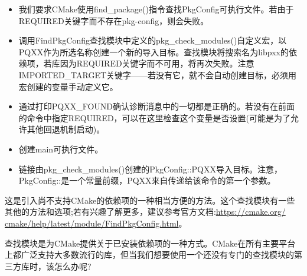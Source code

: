 \begin{itemize}
\item 
我们要求CMake使用find\_package()指令查找PkgConfig可执行文件。若由于REQUIRED关键字而不存在pkg-config，则会失败。

\item 
调用FindPkgConfig查找模块中定义的pkg\_check\_modules()自定义宏，以PQXX作为所选名称创建一个新的导入目标。查找模块将搜索名为libpxx的依赖项，若库因为REQUIRED关键字而不可用，将再次失败。注意IMPORTED\_TARGET关键字——若没有它，就不会自动创建目标，必须用宏创建的变量手动定义它。


\item 
通过打印PQXX\_FOUND确认诊断消息中的一切都是正确的。若没有在前面的命令中指定REQUIRED，可以在这里检查这个变量是否设置(可能是为了允许其他回退机制启动)。

\item 
创建main可执行文件。

\item 
链接由pkg\_check\_modules()创建的PkgConfig::PQXX导入目标。注意，PkgConfig::是一个常量前缀，PQXX来自传递给该命令的第一个参数。
\end{itemize}

这是引入尚不支持CMake的依赖项的一种相当方便的方法。这个查找模块有一些其他的方法和选项;若有兴趣了解更多，建议参考官方文档:\url{https://cmake.org/ cmake/help/latest/module/FindPkgConfig.html}。

查找模块是为CMake提供关于已安装依赖项的一种方式。CMake在所有主要平台上都广泛支持大多数流行的库，但当我们想要使用一个还没有专门的查找模块的第三方库时，该怎么办呢?



















